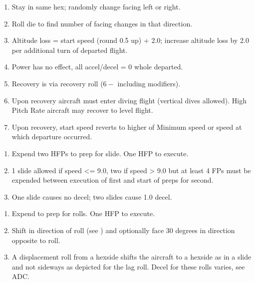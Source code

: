 \begin{table*}
\begin{multicols}{2}
\begin{enumerate}[nosep]
    \item Stay in same hex; randomly change facing left or right.
    \item Roll die to find number of facing changes in that direction.
    \item Altitude loss = start speed (round 0.5 up) + 2.0; increase altitude loss by 2.0 per additional turn of departed flight.
    \item Power has no effect, all accel/decel = 0 whole departed.
    \item Recovery is via recovery roll ($6-$ including modifiers).
    \item Upon recovery aircraft must enter diving flight (vertical dives allowed). High Pitch Rate aircraft may recover to level flight.
    \item Upon recovery, start speed reverts to higher of Minimum speed or speed at which departure occurred.
\end{enumerate}



\begin{enumerate}[nosep]
    \item Expend two HFPs to prep for slide. One HFP to execute.
    \item 1 slide allowed if speed <= 9.0, two if speed > 9.0 but at least 4 FPs must be expended between execution of first and start of preps for second.
    \item One slide causes no decel; two slides cause 1.0 decel.
\end{enumerate}


\begin{enumerate}[nosep]
    \item Expend  to prep for rolls. One HFP to execute.
    \item Shift in direction of roll (see ) and optionally face 30 degrees in direction opposite to roll.
    \item A displacement roll from a hexside shifts the aircraft to a hexside as in a slide and not sideways as depicted for the lag roll. Decel for these rolls varies, see ADC.
\end{enumerate}


\end{multicols}
\end{table*}
